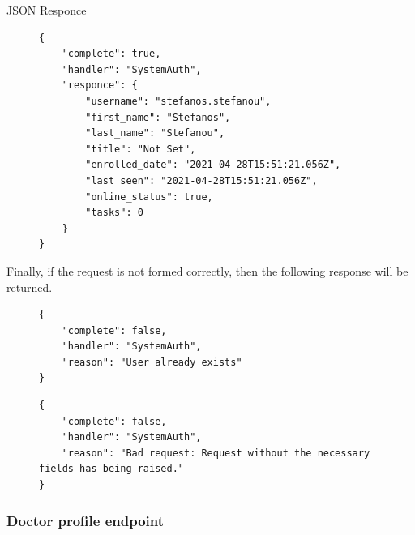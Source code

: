 					JSON Responce
					\begin{figure}[H]
						\iftrue
						\begin{lstlisting}[]
{
	"complete": true,
	"handler": "SystemAuth",
	"responce": {
		"username": "stefanos.stefanou",
		"first_name": "Stefanos",
		"last_name": "Stefanou",
		"title": "Not Set",
		"enrolled_date": "2021-04-28T15:51:21.056Z",
		"last_seen": "2021-04-28T15:51:21.056Z",
		"online_status": true,
		"tasks": 0
	}
}
						\end{lstlisting}
					\end{figure}
					Finally, if the request is not formed correctly, then the following response will be returned.
					\begin{figure}[H]
						\iftrue
						\begin{lstlisting}[]
{
	"complete": false,
	"handler": "SystemAuth",
	"reason": "User already exists"
}
						\end{lstlisting}
					\end{figure}
					
					\begin{figure}[H]
						\iftrue
						\begin{lstlisting}[]
{
	"complete": false,
	"handler": "SystemAuth",
	"reason": "Bad request: Request without the necessary fields has being raised."
}
						\end{lstlisting}
					\end{figure}
				\subsubsection{Doctor profile endpoint}
				
